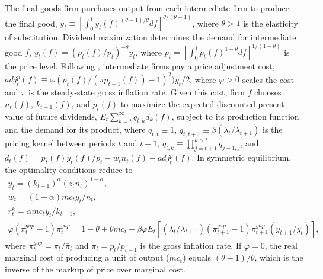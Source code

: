 \documentclass[12pt, final]{article}
\begin{document}
The final goods firm purchases output from each intermediate firm to produce the final good, $y_t \equiv [\int_{0}^1 y_t(f)^{(\theta-1)/\theta}df]^{\theta/(\theta-1)}$, where $\theta > 1$ is the elasticity of substitution. Dividend maximization determines the demand for intermediate good $f$, $y_t(f) = (p_t(f)/p_t)^{-\theta}y_t$, where $p_t = [\int_{0}^{1} p_t(f)^{1-\theta}df]^{1/(1-\theta)}$ is the price level. Following \hyperlink{Rotemberg}{\color{black}{Rotemberg (1982)}}, intermediate firms pay a price adjustment cost, $adj_t^p(f) \equiv \varphi(p_t(f)/(\bar{\pi}p_{t-1}(f))-1)^2)y_t/2$, where $\varphi > 0$ scales the cost and $\bar{\pi}$ is the steady-state gross inflation rate. Given this cost, firm $f$ chooses $n_t(f)$, $k_{t-1}(f)$, and $p_t(f)$ to maximize the expected discounted present value of future dividends, $E_t\sum_{k=t}^\infty q_{t,k}d_k(f)$, subject to its production function and the demand for its product, where $q_{t,t} \equiv 1$, $q_{t,t+1} \equiv \beta(\lambda_t/\lambda_{t+1})$ is the pricing kernel between periods $t$ and $t+1$, $q_{t,k} \equiv \prod_{j=t+1}^{k>t} q_{j-1,j}$, and $d_t(f) = p_t(f)y_t(f)/p_t - w_tn_t(f) - adj_t^p(f)$. In symmetric equilibrium, the optimality conditions reduce to
\begin{gather}
  y_t = (k_{t-1})^\alpha(z_tn_t)^{1-\alpha},\\
  w_t = (1-\alpha)mc_ty_t/n_t,\\
  r_t^k = \alpha mc_t y_t/k_{t-1},\\
  \varphi(\pi_t^{gap}-1)\pi_t^{gap} = 1-\theta + \theta mc_t + \beta\varphi E_t[(\lambda_t/\lambda_{t+1})(\pi_{t+1}^{gap}-1)\pi_{t+1}^{gap}(y_{t+1}/y_t)],
\end{gather}
where $\pi^{gap}_t = \pi_t/\bar{\pi}_t$ and $\pi_t = p_t/p_{t-1}$ is the gross inflation rate. If $\varphi = 0$, the real marginal cost of producing a unit of output ($mc_t$) equals $(\theta-1)/\theta$, which is the inverse of the markup of price over marginal cost.
\end{document}
